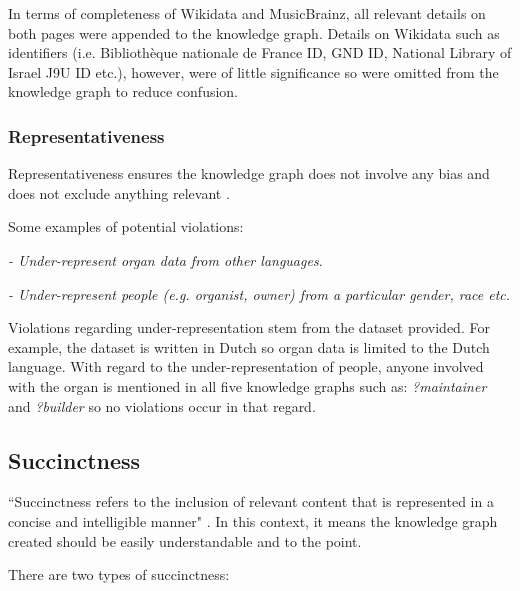 In terms of completeness of Wikidata and MusicBrainz, all relevant details on both pages were appended to the knowledge graph. Details on Wikidata such as identifiers (i.e. Bibliothèque nationale de France ID, GND ID, National Library of Israel J9U ID etc.), however, were of little significance so were omitted from the knowledge graph to reduce confusion.

\subsubsection{Representativeness}
\hspace{0.5cm} Representativeness ensures the knowledge graph does not involve any bias and does not exclude anything relevant \cite{knowledgegraphevaulationbook}.

\noindent Some examples of potential violations: 

\vspace{-0.1cm}
\begin{displayquote}
    \textit{- Under-represent organ data from other languages.}
\end{displayquote}  
\vspace{-0.675cm}
\begin{displayquote}
     \textit{- Under-represent people (e.g. organist, owner) from a particular gender, race etc. }  
\end{displayquote}
\vspace{-0.1cm}

Violations regarding under-representation stem from the dataset provided. For example, the dataset is written in Dutch so organ data is limited to the Dutch language. With regard to the under-representation of people, anyone involved with the organ is mentioned in all five knowledge graphs such as: \textit{?maintainer} and \textit{?builder} so no violations occur in that regard.

\subsection{Succinctness}
\hspace{0.5cm} ``Succinctness refers to the inclusion of relevant content that is represented in a concise and intelligible manner" \cite{knowledgegraphevaulationbook}. In this context, it means the knowledge graph created should be easily understandable and to the point. 

\noindent There are two types of succinctness: 

